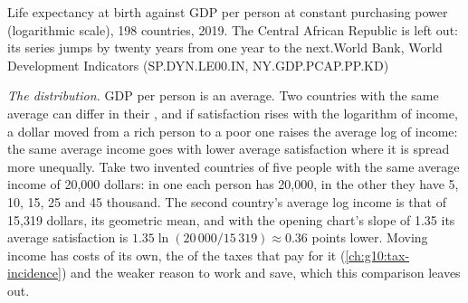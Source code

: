 \begin{omchart}{Life expectancy at birth against GDP per person at constant purchasing power (logarithmic scale), 198 countries, 2019. The Central African Republic
is left out: its series jumps by twenty years from one year to the next.}{World Bank, World Development Indicators (SP.DYN.LE00.IN, NY.GDP.PCAP.PP.KD)}
\end{omchart}

\emph{The distribution.} GDP per person is an average. Two countries with the same average can differ in their , and if satisfaction rises with the logarithm
of income, a dollar moved from a rich person to a poor one raises the average log of income: the same average income goes with lower average satisfaction where it is
spread more unequally. Take two invented countries of five people with the same average income of 20,000 dollars: in one each person has 20,000, in the other
they have 5, 10, 15, 25 and 45 thousand. The second country's average log income is that of 15,319 dollars, its geometric mean, and with the opening chart's slope of
1.35 its average satisfaction is $1.35 \ln(20\,000/15\,319) \approx 0.36$ points lower. Moving income has costs of its own, the  of the taxes that pay for
it (\cref{ch:g10:tax-incidence}) and the weaker reason to work and save, which this comparison leaves out.

